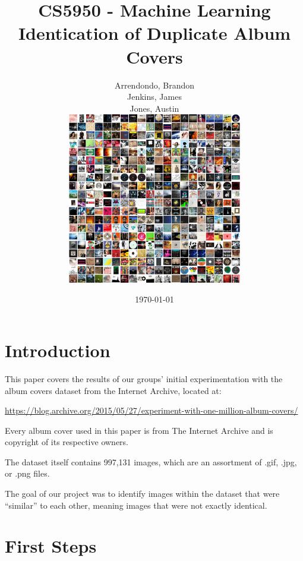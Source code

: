 \documentclass[11pt,a4paper,titlepage]{article}
\begin{document}
\title{CS5950 - Machine Learning \\
       Identication of Duplicate Album Covers}

\author{Arrendondo, Brandon\\
        Jenkins, James\\
        Jones, Austin\\
        \includegraphics[width=3in]{covers.png}\\[1ex]
    }
\date{\today}

\maketitle

\newpage

\section{Introduction}

This paper covers the results of our groups' initial experimentation with the
album covers dataset from the Internet Archive, located at:

\url{https://blog.archive.org/2015/05/27/experiment-with-one-million-album-covers/}

Every album cover used in this paper is from The Internet Archive and is 
copyright of its respective owners.

The dataset itself contains 997,131 images, which are an assortment of .gif,
.jpg, or .png files.

The goal of our project was to identify images within the dataset that were 
``similar'' to each other, meaning images that were not exactly identical.

\section{First Steps}
\end{document}
